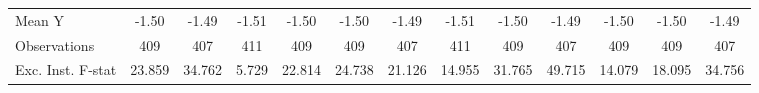 {\begin{tabular}{l*{12}{c}}
\midrule
Mean Y      &       -1.50         &       -1.49         &       -1.51         &       -1.50         &       -1.50         &       -1.49         &       -1.51         &       -1.50         &       -1.49         &       -1.50         &       -1.50         &       -1.49         \\
Observations&         409         &         407         &         411         &         409         &         409         &         407         &         411         &         409         &         407         &         409         &         409         &         407         \\
Exc. Inst. F-stat&      23.859         &      34.762         &       5.729         &      22.814         &      24.738         &      21.126         &      14.955         &      31.765         &      49.715         &      14.079         &      18.095         &      34.756         \\
\bottomrule
\end{tabular}
}

